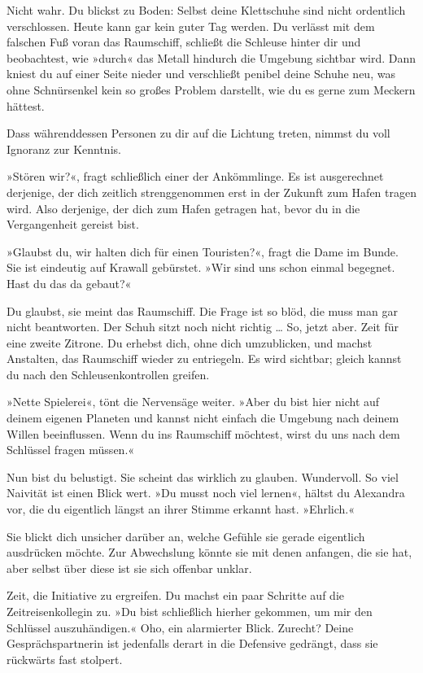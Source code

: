 Nicht wahr. Du blickst zu Boden: Selbst deine Klettschuhe sind nicht ordentlich verschlossen. Heute kann gar kein guter Tag werden. Du verlässt mit dem falschen Fuß voran das Raumschiff, schließt die Schleuse hinter dir und beobachtest, wie »durch« das Metall hindurch die Umgebung sichtbar wird. Dann kniest du auf einer Seite nieder und verschließt penibel deine Schuhe neu, was ohne Schnürsenkel kein so großes Problem darstellt, wie du es gerne zum Meckern hättest.

Dass währenddessen Personen zu dir auf die Lichtung treten, nimmst du voll Ignoranz zur Kenntnis.

»Stören wir?«, fragt schließlich einer der Ankömmlinge. Es ist ausgerechnet derjenige, der dich zeitlich strenggenommen erst in der Zukunft zum Hafen tragen wird. Also derjenige, der dich zum Hafen getragen hat, bevor du in die Vergangenheit gereist bist.

»Glaubst du, wir halten dich für einen Touristen?«, fragt die Dame im Bunde. Sie ist eindeutig auf Krawall gebürstet. »Wir sind uns schon einmal begegnet. Hast du das da gebaut?«

Du glaubst, sie meint das Raumschiff. Die Frage ist so blöd, die muss man gar nicht beantworten. Der Schuh sitzt noch nicht richtig … So, jetzt aber. Zeit für eine zweite Zitrone. Du erhebst dich, ohne dich umzublicken, und machst Anstalten, das Raumschiff wieder zu entriegeln. Es wird sichtbar; gleich kannst du nach den Schleusenkontrollen greifen.

»Nette Spielerei«, tönt die Nervensäge weiter. »Aber du bist hier nicht auf deinem eigenen Planeten und kannst nicht einfach die Umgebung nach deinem Willen beeinflussen. Wenn du ins Raumschiff möchtest, wirst du uns nach dem Schlüssel fragen müssen.«

Nun bist du belustigt. Sie scheint das wirklich zu glauben. Wundervoll. So viel Naivität ist einen Blick wert. »Du musst noch viel lernen«, hältst du Alexandra vor, die du eigentlich längst an ihrer Stimme erkannt hast. »Ehrlich.«

Sie blickt dich unsicher darüber an, welche Gefühle sie gerade eigentlich ausdrücken möchte. Zur Abwechslung könnte sie mit denen anfangen, die sie hat, aber selbst über diese ist sie sich offenbar unklar.

Zeit, die Initiative zu ergreifen. Du machst ein paar Schritte auf die Zeitreisenkollegin zu. »Du bist schließlich hierher gekommen, um mir den Schlüssel auszuhändigen.« Oho, ein alarmierter Blick. Zurecht? Deine Gesprächspartnerin ist jedenfalls derart in die Defensive gedrängt, dass sie rückwärts fast stolpert.

